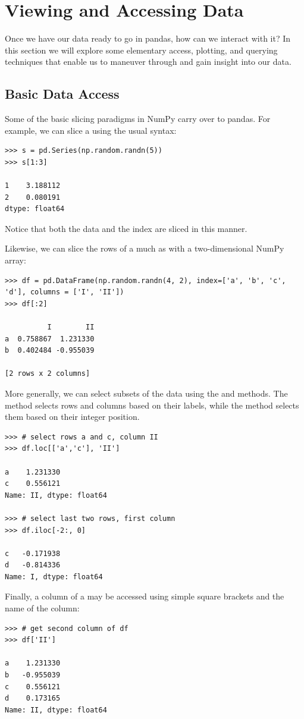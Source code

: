\section*{Viewing and Accessing Data}

Once we have our data ready to go in pandas, how can we interact with it?
In this section we will explore some elementary access, plotting, and querying techniques that enable us to maneuver through
and gain insight into our data.

\subsection*{Basic Data Access}
Some of the basic slicing paradigms in NumPy carry over to pandas. 
For example, we can slice a  using the usual syntax:
\begin{lstlisting}
>>> s = pd.Series(np.random.randn(5))
>>> s[1:3]

1    3.188112
2    0.080191
dtype: float64
\end{lstlisting}
Notice that both the data and the index are sliced in this manner.

Likewise, we can slice the rows of a  much as with a two-dimensional NumPy array:
\begin{lstlisting}
>>> df = pd.DataFrame(np.random.randn(4, 2), index=['a', 'b', 'c', 'd'], columns = ['I', 'II'])
>>> df[:2]

          I        II
a  0.758867  1.231330
b  0.402484 -0.955039

[2 rows x 2 columns]
\end{lstlisting}

More generally, we can select subsets of the data using the  and  methods.
The  method selects rows and columns based on their labels, while the  method
selects them based on their integer position.
\begin{lstlisting}
>>> # select rows a and c, column II
>>> df.loc[['a','c'], 'II']

a    1.231330
c    0.556121
Name: II, dtype: float64

>>> # select last two rows, first column
>>> df.iloc[-2:, 0]

c   -0.171938
d   -0.814336
Name: I, dtype: float64
\end{lstlisting}
Finally, a column of a  may be accessed using simple square brackets and the name of the column:
\begin{lstlisting}
>>> # get second column of df
>>> df['II']

a    1.231330
b   -0.955039
c    0.556121
d    0.173165
Name: II, dtype: float64
\end{lstlisting}

